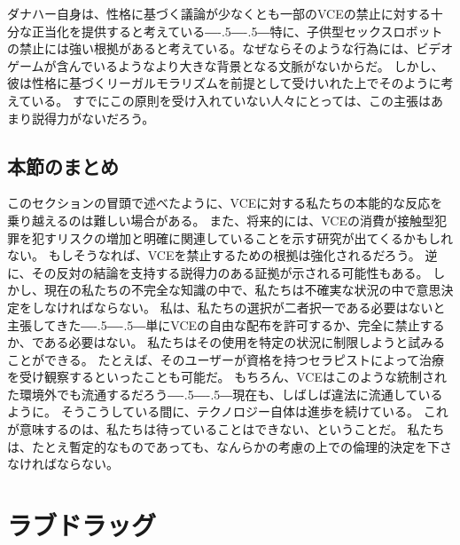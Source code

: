 \documentclass[paper=a4,book,openany]{jlreq}
\def\DDASH{―\kern-.5\zw―\kern-.5\zw―} %
\begin{document}
ダナハー自身は、性格に基づく議論が少なくとも一部のVCEの禁止に対する十分な正当化を提供すると考えている{\DDASH}特に、子供型セックスロボットの禁止には強い根拠があると考えている。なぜならそのような行為には、ビデオゲームが含んでいるようなより大きな背景となる文脈がないからだ。
しかし、彼は性格に基づくリーガルモラリズムを前提として受けいれた上でそのように考えている。
すでにこの原則を受け入れていない人々にとっては、この主張はあまり説得力がないだろう。

\subsection{本節のまとめ}

このセクションの冒頭で述べたように、VCEに対する私たちの本能的な反応を乗り越えるのは難しい場合がある。
また、将来的には、VCEの消費が接触型犯罪を犯すリスクの増加と明確に関連していることを示す研究が出てくるかもしれない。
もしそうなれば、VCEを禁止するための根拠は強化されるだろう。
逆に、その反対の結論を支持する説得力のある証拠が示される可能性もある。
しかし、現在の私たちの不完全な知識の中で、私たちは不確実な状況の中で意思決定をしなければならない。
私は、私たちの選択が二者択一である必要はないと主張してきた{\DDASH}単にVCEの自由な配布を許可するか、完全に禁止するか、である必要はない。
私たちはその使用を特定の状況に制限しようと試みることができる。
たとえば、そのユーザーが資格を持つセラピストによって治療を受け観察するといったことも可能だ。
もちろん、VCEはこのような統制された環境外でも流通するだろう{\DDASH}現在も、しばしば違法に流通しているように。
そうこうしている間に、テクノロジー自体は進歩を続けている。
これが意味するのは、私たちは待っていることはできない、ということだ。
私たちは、たとえ暫定的なものであっても、なんらかの考慮の上での倫理的決定を下さなければならない。

\section{ラブドラッグ}
\end{document}
